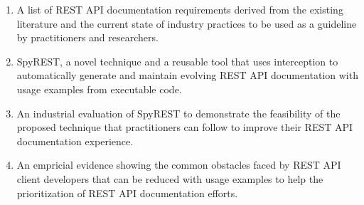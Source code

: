 \begin{enumerate}
  \item A list of REST API documentation requirements derived from the existing literature and the current state of industry practices to be used as a guideline by practitioners and researchers.
  \item SpyREST, a novel technique and a reusable tool that uses interception to automatically generate and maintain evolving REST API documentation with usage examples from executable code.
  \item An industrial evaluation of SpyREST to demonstrate the feasibility of the proposed technique that practitioners can follow to improve their REST API documentation experience.
  \item An empricial evidence showing the common obstacles faced by REST API client developers that can be reduced with usage examples to help the prioritization of REST API documentation efforts.
\end{enumerate}





